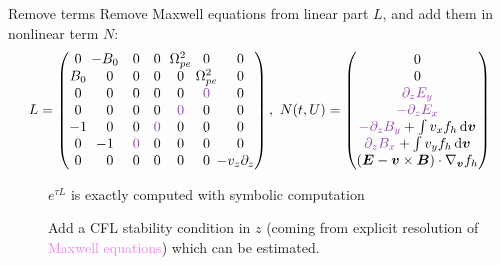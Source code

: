 \documentclass{beamer}
\newcommand{\cmark}{{\color{dgreen}\ding{52}}}
\newcommand{\xmark}{{\color{red}\ding{55}}}
\newcommand{\Mvb}[1]{\boldsymbol{#1}}
\begin{document}
\begin{frame}{Remove terms}
  Remove Maxwell equations from linear part $L$, and add them in nonlinear term $N$:
  $$
    L = \begin{pmatrix}
      0   & \hspace{-0.25cm}-B_0 & 0 & 0 & \hspace{-0.125cm}\Omega_{pe}^2\hspace{-0.125cm} &                  0                              & 0 \\ 
      B_0 &                  0   & 0 & 0 &                  0                              & \hspace{-0.125cm}\Omega_{pe}^2\hspace{-0.125cm} & 0 \\
      0   &                  0   & 0 & 0 &                  0                              &                  \textcolor{violet}{0}                              & 0 \\ 
      0   &                  0   & 0 & 0 &                  \textcolor{violet}{0}                              &                  0                              & 0 \\ 
      -1  &                  0   & 0 & \textcolor{violet}{0} &                  0                              &                  0                              & 0 \\ 
      0   & \hspace{-0.25cm}-1   & \textcolor{violet}{0} & 0 &                  0                              &                  0                              & 0 \\ 
      0   &                  0   & 0 & 0 &                  0                              &                  0                              & \hspace{-0.25cm}-v_z\partial_z \\ 
    \end{pmatrix}
    ,\ 
    N(t,U) = \begin{pmatrix}
      0 \\
      0 \\
      \textcolor{violet}{ \partial_zE_y} \\
      \textcolor{violet}{-\partial_zE_x} \\
      \textcolor{violet}{-\partial_zB_y} + \int v_xf_h\dd{\Mvb{v}} \\
      \textcolor{violet}{ \partial_zB_x} + \int v_yf_h\dd{\Mvb{v}} \\
      (\Mvb{E}-\Mvb{v}\times\Mvb{B})\cdot\nabla_{\Mvb{v}}f_h
    \end{pmatrix}
  $$
  \begin{description}
    \item[\cmark] $e^{\tau L}$ is exactly computed with symbolic computation
    \item[\xmark] Add a CFL stability condition in $z$ (coming from explicit resolution of \textcolor{violet}{Maxwell equations}) which can be estimated.
  \end{description}
\end{frame}
\end{document}
